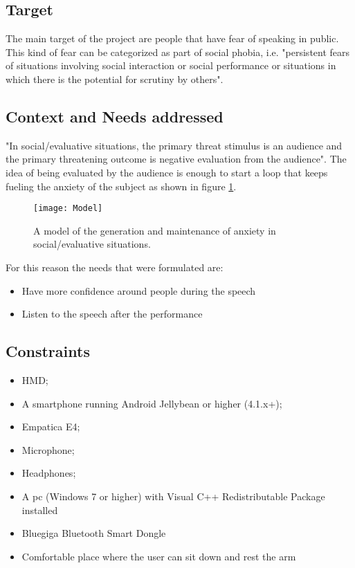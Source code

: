 \subsection{Target}
The main target of the project are people that have fear of speaking in public. This kind of fear can be categorized as part of social phobia, i.e. "persistent fears of situations involving social interaction or social performance or situations in which there is the potential for scrutiny by others"\cite{model}.

\subsection{Context and Needs addressed}
"In social/evaluative situations, the primary threat stimulus is an audience and the primary threatening outcome is negative evaluation from the audience"\cite{model}.
The idea of being evaluated by the audience is enough to start a loop that keeps fueling the anxiety of the subject as shown in figure \ref{fig:model}.
\begin{figure}[!h]
	\centering
	\texttt{[image: Model]}
	\caption{A model of the generation and maintenance of anxiety in social/evaluative situations\cite{model}.}\label{fig:model}
\end{figure}

For this reason the needs that were formulated are:
\begin{itemize}
	\item Have more confidence around people during the speech
	\item Listen to the speech after the performance
\end{itemize}

\subsection{Constraints}
\begin{itemize}
	\item HMD;
	\item A smartphone running Android Jellybean or higher (4.1.x+);
	\item Empatica E4;
	\item Microphone;
	\item Headphones;
	\item A pc (Windows 7 or higher) with Visual C++ Redistributable Package installed
	\item Bluegiga Bluetooth Smart Dongle
	\item Comfortable place where the user can sit down and rest the arm
\end{itemize}

